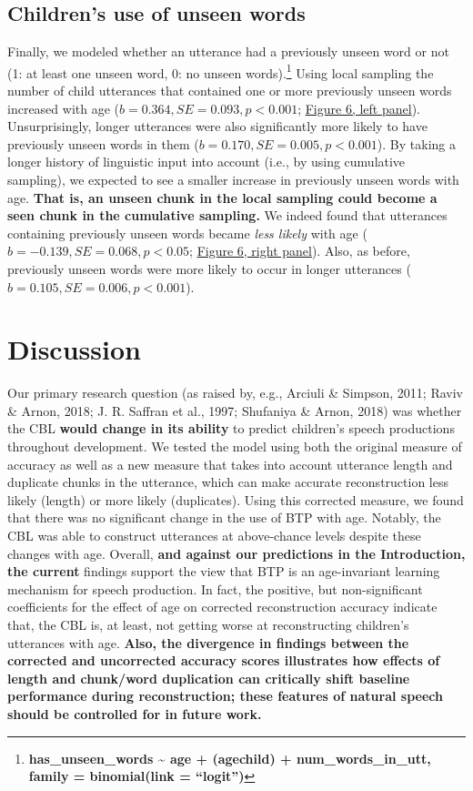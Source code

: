 \documentclass[man,mask,floatsintext]{apa6}
\let\rmarkdownfootnote\footnote%
\def\footnote{\protect\rmarkdownfootnote}
\begin{document}
\subsection{Children's use of unseen
words}\label{childrens-use-of-unseen-words}

Finally, we modeled whether an utterance had a previously unseen word or
not (1: at least one unseen word, 0: no unseen words).\footnote{\textbf{has\_unseen\_words
  \textasciitilde{} age + (age\textbar{}child) + num\_words\_in\_utt,
  family = binomial(link = \enquote{logit})}} Using local sampling the
number of child utterances that contained one or more previously unseen
words increased with age (\(b = 0.364, SE = 0.093, p < 0.001\);
\protect\hyperlink{fig6}{Figure 6, left panel}). Unsurprisingly, longer
utterances were also significantly more likely to have previously unseen
words in them (\(b = 0.170, SE = 0.005, p < 0.001\)). By taking a longer
history of linguistic input into account (i.e., by using cumulative
sampling), we expected to see a smaller increase in previously unseen
words with age. \textbf{That is, an unseen chunk in the local sampling
could become a seen chunk in the cumulative sampling.} We indeed found
that utterances containing previously unseen words became \emph{less
likely} with age (\(b = -0.139, SE = 0.068, p < 0.05\);
\protect\hyperlink{fig6}{Figure 6, right panel}). Also, as before,
previously unseen words were more likely to occur in longer utterances
(\(b = 0.105, SE = 0.006, p < 0.001\)).

\section{Discussion}\label{discussion}

Our primary research question (as raised by, e.g., Arciuli \& Simpson,
2011; Raviv \& Arnon, 2018; J. R. Saffran et al., 1997; Shufaniya \&
Arnon, 2018) was whether the CBL \textbf{would change in its ability} to
predict children's speech productions throughout development. We tested
the model using both the original measure of accuracy as well as a new
measure that takes into account utterance length and duplicate chunks in
the utterance, which can make accurate reconstruction less likely
(length) or more likely (duplicates). Using this corrected measure, we
found that there was no significant change in the use of BTP with age.
Notably, the CBL was able to construct utterances at above-chance levels
despite these changes with age. Overall, \textbf{and against our
predictions in the Introduction, the current} findings support the view
that BTP is an age-invariant learning mechanism for speech production.
In fact, the positive, but non-significant coefficients for the effect
of age on corrected reconstruction accuracy indicate that, the CBL is,
at least, not getting worse at reconstructing children's utterances with
age. \textbf{Also, the divergence in findings between the corrected and
uncorrected accuracy scores illustrates how effects of length and
chunk/word duplication can critically shift baseline performance during
reconstruction; these features of natural speech should be controlled
for in future work.}
\end{document}
